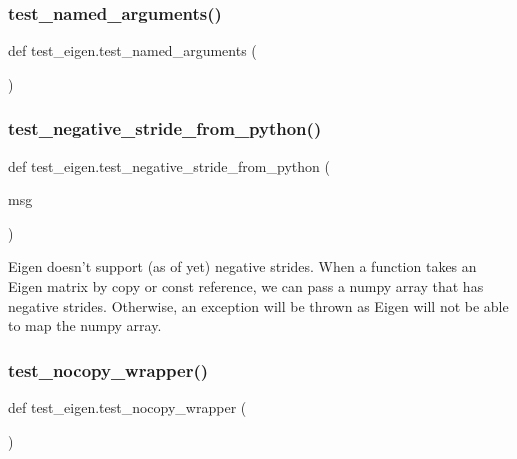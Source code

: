 \mbox{\label{namespacetest__eigen_a9625cae80f44d0f43e53a204c55ad8b9}} 
\subsubsection{\texorpdfstring{test\_named\_arguments()}{test\_named\_arguments()}}
{\footnotesize\ttfamily def test\+\_\+eigen.\+test\+\_\+named\+\_\+arguments (\begin{DoxyParamCaption}{ }\end{DoxyParamCaption})}

\mbox{\label{namespacetest__eigen_a0e35d7be937ef9bac86e71b860295f98}} 
\subsubsection{\texorpdfstring{test\_negative\_stride\_from\_python()}{test\_negative\_stride\_from\_python()}}
{\footnotesize\ttfamily def test\+\_\+eigen.\+test\+\_\+negative\+\_\+stride\+\_\+from\+\_\+python (\begin{DoxyParamCaption}\item[{}]{msg }\end{DoxyParamCaption})}

\begin{DoxyVerb}Eigen doesn't support (as of yet) negative strides. When a function takes an Eigen matrix by
copy or const reference, we can pass a numpy array that has negative strides.  Otherwise, an
exception will be thrown as Eigen will not be able to map the numpy array.\end{DoxyVerb}
 \mbox{\label{namespacetest__eigen_a5e82145a28d8d85695922c17514ccf48}} 
\subsubsection{\texorpdfstring{test\_nocopy\_wrapper()}{test\_nocopy\_wrapper()}}
{\footnotesize\ttfamily def test\+\_\+eigen.\+test\+\_\+nocopy\+\_\+wrapper (\begin{DoxyParamCaption}{ }\end{DoxyParamCaption})}

